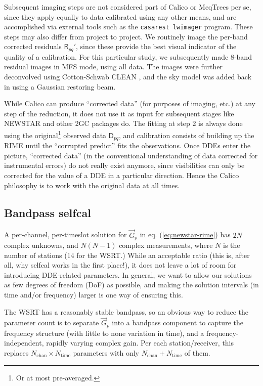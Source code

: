 \documentclass[]{aa}
\newcommand{\jones}[2]{\vec {#1}_{#2}}
\newcommand{\coh}[2]{\mathsf{{#1}}_{{#2}}}
\begin{document}
Subsequent imaging steps are not considered part of Calico or MeqTrees per se, since they apply equally to data calibrated using any other means, and are accomplished via external tools such as the {\tt casarest lwimager} program. These steps may also differ from project to project. We routinely image the per-band corrected residuals $\coh{R}{pq}'$, since these provide the best visual indicator of the quality of a calibration. For this particular study, we subsequently made 8-band residual images in MFS mode, using all data. The images were further deconvolved using Cotton-Schwab CLEAN \citep{Schwab:csclean}, and the sky model was added back in using a Gaussian restoring beam.

While Calico can produce ``corrected data'' (for purposes of imaging, etc.) at any step of the reduction, it does not use it as input for subsequent stages like NEWSTAR and other 2GC packages do. The fitting at step 2 is always done using the original\footnote{Or at most pre-averaged.} observed data $\coh{D}{pq}$, and calibration consists of building up the RIME until the ``corrupted predict'' fits the observations. Once DDEs enter the picture, ``corrected data'' (in the conventional understanding of data corrected for instrumental errors) do not really exist anymore, since visibilities can only be corrected for the value of a DDE in a particular direction. Hence the Calico philosophy is to work with the original data at all times.

\subsection{Bandpass selfcal}

A per-channel, per-timeslot solution for $\jones{G}{p}$ in eq. (\ref{eq:newstar-rime}) has $2N$ complex unknowns, and $N(N-1)$ complex measurements, where $N$ is the number of stations (14 for the WSRT.) While an acceptable ratio (this is, after all, why selfcal works in the first place!), it does not leave a lot of room for introducing DDE-related parameters. In general, we want to allow our solutions as few degrees of freedom (DoF) as possible, and making the solution intervals (in time and/or frequency) larger is one way of ensuring this.

The WSRT has a reasonably stable bandpass, so an obvious way to reduce the parameter count is to separate $\jones{G}{p}$ into a bandpass component to capture the frequency structure (with little to none variation in time), and a frequency-independent, rapidly varying complex gain. Per each station/receiver, this replaces $N_\mathrm{chan}\times N_\mathrm{time}$ parameters with only $N_\mathrm{chan}+N_\mathrm{time}$ of them.
\end{document}
